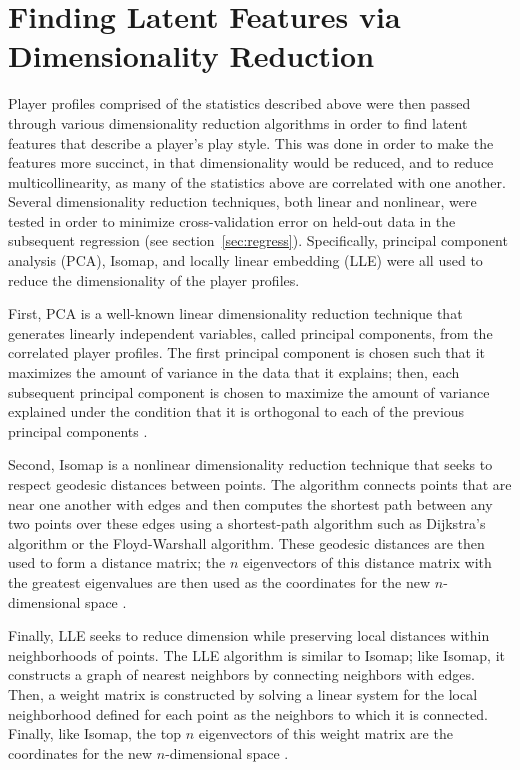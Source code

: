 \section{Finding Latent Features via Dimensionality Reduction}
\label{sec:dim_red}

Player profiles comprised of the statistics described above were then passed through
various dimensionality reduction algorithms in order to find latent features that
describe a player's play style. This was done in order to make the features more
succinct, in that dimensionality would be reduced, and to reduce multicollinearity,
as many of the statistics above are correlated with one another. Several
dimensionality reduction techniques, both linear and nonlinear, were tested in order
to minimize cross-validation error on held-out data in the subsequent regression
(see section~\ref{sec:regress}). Specifically, principal component analysis (PCA),
Isomap, and locally linear embedding (LLE) were all used to reduce the
dimensionality of the player profiles.

First, PCA is a well-known linear dimensionality reduction technique that generates
linearly independent variables, called principal components, from the correlated
player profiles. The first principal component is chosen such that it maximizes the
amount of variance in the data that it explains; then, each subsequent principal
component is chosen to maximize the amount of variance explained under the condition
that it is orthogonal to each of the previous principal components \cite{PCA}.

Second, Isomap is a nonlinear dimensionality reduction technique that seeks to
respect geodesic distances between points. The algorithm connects points that are
near one another with edges and then computes the shortest path between any two
points over these edges using a shortest-path algorithm such as Dijkstra's algorithm
or the Floyd-Warshall algorithm. These geodesic distances are then used to form a
distance matrix; the $n$ eigenvectors of this distance matrix with the greatest
eigenvalues are then used as the coordinates for the new $n$-dimensional space
\cite{Isomap}.

Finally, LLE seeks to reduce dimension while preserving local distances within
neighborhoods of points. The LLE algorithm is similar to Isomap; like Isomap, it
constructs a graph of nearest neighbors by connecting neighbors with edges. Then, a
weight matrix is constructed by solving a linear system for the local neighborhood
defined for each point as the neighbors to which it is connected. Finally, like
Isomap, the top $n$ eigenvectors of this weight matrix are the coordinates for the
new $n$-dimensional space \cite{LLE}.

